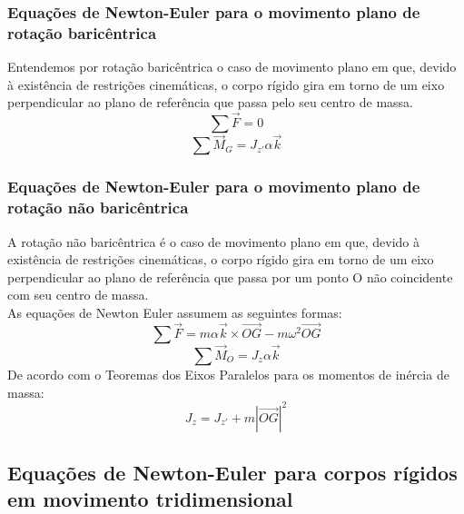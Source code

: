 \documentclass[a4paper, 12pt]{article}
\begin{document}
	\subsubsection{Equações de Newton-Euler para o movimento plano de rotação baricêntrica}
		Entendemos por rotação baricêntrica o caso de movimento plano em que, devido à existência de restrições cinemáticas, o corpo rígido gira em torno de um eixo perpendicular ao plano de referência que passa pelo seu centro de massa. 
		\begin{equation}
			\sum\vec{F} = 0
		\end{equation}
		\begin{equation}
			\sum\vec{M}_G = J_{z'}\alpha \vec{k}
		\end{equation}

	\subsubsection{Equações de Newton-Euler para o movimento plano de rotação não baricêntrica}
		A rotação não baricêntrica é o caso de movimento plano em que, devido à existência de restrições cinemáticas, o corpo rígido gira em torno de um eixo perpendicular ao plano de referência que passa por um ponto O não coincidente com seu centro de massa.\\
		
		As equações de Newton Euler assumem as seguintes formas:
		\begin{equation}
			\sum\vec{F} = m\alpha\vec{k} \times \vec{OG} - m\omega^2 \vec{OG}
		\end{equation}
		\begin{equation}
			\sum\vec{M}_O = J_z\alpha\vec{k}
		\end{equation}
		De acordo com o Teoremas dos Eixos Paralelos para os momentos de inércia de massa:
		\begin{equation}
			J_z = J_{z'} + m |\vec{OG}|^2
		\end{equation}

	\subsection{Equações de Newton-Euler para corpos rígidos em movimento tridimensional}
\end{document}
